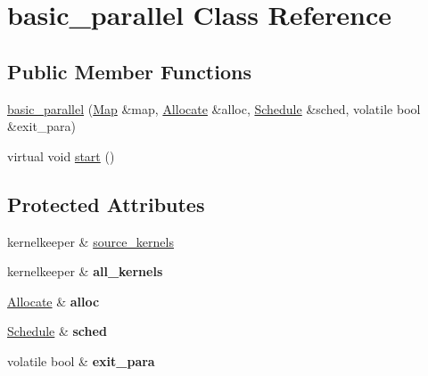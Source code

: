\hypertarget{classbasic__parallel}{}\section{basic\+\_\+parallel Class Reference}
\label{classbasic__parallel}
\subsection*{Public Member Functions}
\begin{DoxyCompactItemize}
\item 
\hyperlink{classbasic__parallel_a6f8a4933fb29d6f4c60ebb3e934b192e}{basic\+\_\+parallel} (\hyperlink{class_map}{Map} \&map, \hyperlink{class_allocate}{Allocate} \&alloc, \hyperlink{class_schedule}{Schedule} \&sched, volatile bool \&exit\+\_\+para)
\item 
virtual void \hyperlink{classbasic__parallel_a85ea2560d40ad50482468e39d626a52b}{start} ()
\end{DoxyCompactItemize}
\subsection*{Protected Attributes}
\begin{DoxyCompactItemize}
\item 
kernelkeeper \& \hyperlink{classbasic__parallel_a969b8832b2f6eaea5e985d4582d9e4dc}{source\+\_\+kernels}
\item 
\hypertarget{classbasic__parallel_a028feb03732d5fef0e9d184ddc18ce7b}{}kernelkeeper \& {\bfseries all\+\_\+kernels}\label{classbasic__parallel_a028feb03732d5fef0e9d184ddc18ce7b}

\item 
\hypertarget{classbasic__parallel_aab09daae41a9d218568115be037a8357}{}\hyperlink{class_allocate}{Allocate} \& {\bfseries alloc}\label{classbasic__parallel_aab09daae41a9d218568115be037a8357}

\item 
\hypertarget{classbasic__parallel_a9124d0bfd5d75277ddd44fb59814435a}{}\hyperlink{class_schedule}{Schedule} \& {\bfseries sched}\label{classbasic__parallel_a9124d0bfd5d75277ddd44fb59814435a}

\item 
\hypertarget{classbasic__parallel_ac648d03dceed09e7834d656f561da33b}{}volatile bool \& {\bfseries exit\+\_\+para}\label{classbasic__parallel_ac648d03dceed09e7834d656f561da33b}

\end{DoxyCompactItemize}


